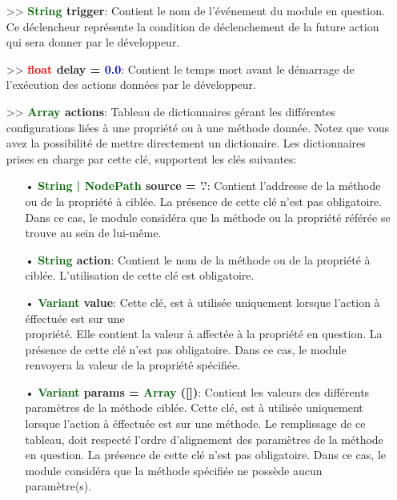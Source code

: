 \documentclass[a4paper, 11pt]{article}
\begin{document}
	\begin{itemize}
		\item[>> \textbf{\textcolor{darkgreen}{String} trigger}:] Contient le nom de l'événement du module
		en question. Ce déclencheur représente la condition de déclenchement de la future action qui sera
		donner par le développeur.\\
		\item[>> \textbf{\textcolor{red}{float} delay = \textcolor{blue}{0.0}}:] Contient le temps mort
		avant le démarrage de l'exécution des actions données par le développeur.\\
		\newpage\item[>> \textbf{\textcolor{darkgreen}{Array} actions}:] Tableau de dictionnaires gérant les
		différentes configurations liées à une propriété ou à une méthode donnée. Notez que vous avez la
		possibilité de mettre directement un dictionaire. Les dictionnaires prises en charge par cette clé, 
		supportent les clés suivantes:
		\begin{itemize}
			\item[• \textbf{\textcolor{darkgreen}{String | NodePath} source = '.'}:] Contient l'addresse de
			la méthode ou de la propriété à ciblée. La présence de cette clé n'est pas obligatoire. Dans ce
			cas, le module considéra que la méthode ou la propriété référée se trouve au sein de lui-même.\\
			\item[• \textbf{\textcolor{darkgreen}{String} action}:] Contient le nom de la méthode ou de la
			propriété à ciblée. L'utilisation de cette clé est obligatoire.\\
			\item[• \textbf{\textcolor{darkgreen}{Variant} value}:] Cette clé, est à utilisée uniquement 
			lorsque l'action à éffectuée est sur une \\propriété. Elle contient la valeur à affectée à la 
			propriété en question. La présence de cette clé n'est pas obligatoire. Dans ce cas, le module
			renvoyera la valeur de la propriété spécifiée.\\
			\item[• \textbf{\textcolor{darkgreen}{Variant} params = \textcolor{darkgreen}{Array} ([])}:]
			Contient les valeurs des différents paramètres de la méthode ciblée. Cette clé, est à utilisée 
			uniquement lorsque l'action à éffectuée est sur une méthode. Le remplissage de ce tableau, doit
			respecté l'ordre d'alignement des paramètres de la méthode en question. La présence de cette clé
			n'est pas obligatoire. Dans ce cas, le module considéra que la méthode spécifiée ne possède
			aucun paramètre(s).\\
		\end{itemize}
	\end{itemize}
\end{document}

